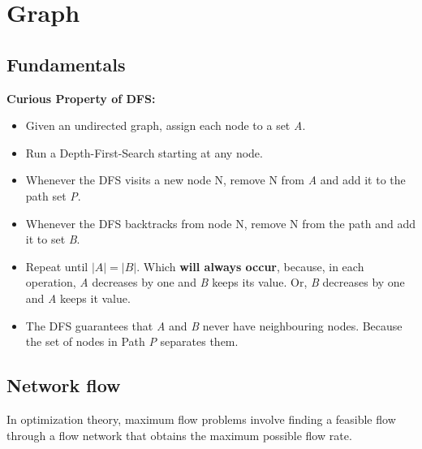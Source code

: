 \chapter{Graph}

\section{Fundamentals}

	\textbf{Curious Property of DFS:} 
	
	\begin{itemize}
	\item Given an undirected graph, assign each node to a set \textit{A}.
	
	\item Run a Depth-First-Search starting at any node.
	
	\item Whenever the DFS visits a new node N, remove N from \textit{A} and add it to the path set \textit{P}.
	
	\item Whenever the DFS backtracks from node N, remove N from the path and add it to set \textit{B}.
	
	\item Repeat until $|A| = |B|$. Which \textbf{will always occur}, because, 
	in each operation, \textit{A} decreases by one and \textit{B} keeps its value. 
	Or, \textit{B} decreases by one and \textit{A} keeps it value.
	
	\item The DFS guarantees that \textit{A} and \textit{B} never have neighbouring nodes. 
	Because the set of nodes in Path \textit{P} separates them.
	\end{itemize}
	


\section{Network flow}

	In optimization theory, maximum flow problems involve finding a 
	feasible flow through a flow network that obtains the maximum possible flow rate. 

	

    \vspace{75pts}

